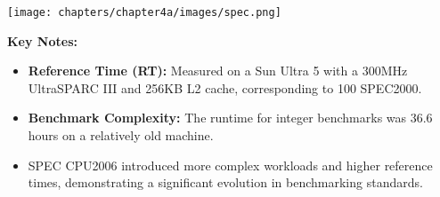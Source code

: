 \begin{center}
    \texttt{[image: chapters/chapter4a/images/spec.png]}
\end{center}

\textbf{Key Notes:}
\begin{itemize}
    \item \textbf{Reference Time (RT):} Measured on a Sun Ultra 5 with a 300MHz UltraSPARC III and 256KB L2 cache, corresponding to 100 SPEC2000.
    \item \textbf{Benchmark Complexity:} The runtime for integer benchmarks was 36.6 hours on a relatively old machine.
    \item SPEC CPU2006 introduced more complex workloads and higher reference times, demonstrating a significant evolution in benchmarking standards.
\end{itemize}
